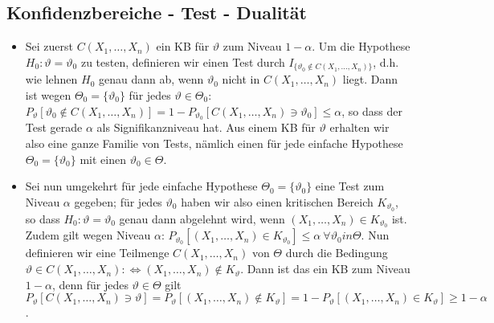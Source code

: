\subsection{Konfidenzbereiche - Test - Dualität}
\begin{itemize}
    \item Sei zuerst $C(X_1, \dots, X_n)$ ein KB für $\vartheta$ zum Niveau $1 - \alpha$. Um die Hypothese $H_0 : \vartheta = \vartheta_0$ zu testen, definieren wir einen Test durch $I_{\{\vartheta_0 \notin C(X_1, \dots, X_n)\} }$, d.h. wie lehnen $H_0$ genau dann ab, wenn $\vartheta_0$ nicht in $C(X_1, \dots, X_n)$ liegt. Dann ist wegen $\Theta_0 = \{\vartheta_0\}$ für jedes $\vartheta \in \Theta_0$:\\
    $P_\vartheta[\vartheta_0 \notin C(X_1, \dots, X_n)] = 1 - P_{\vartheta_0}[C(X_1, \dots, X_n) \ni \vartheta_0] \le \alpha$, so dass der Test gerade $\alpha$ als Signifikanzniveau hat. Aus einem KB für $\vartheta$ erhalten wir also eine ganze Familie von Tests, nämlich einen für jede einfache Hypothese $\Theta_0 = \{\vartheta_0\}$ mit einen $\vartheta_0 \in \Theta$.
\item Sei nun umgekehrt für jede einfache Hypothese $\Theta_0 = \{\vartheta_0\} $ eine Test zum Niveau $\alpha$ gegeben; für jedes $\vartheta_0$ haben wir also einen kritischen Bereich $K_{\vartheta_0}$, so dass $H_0: \vartheta = \vartheta_0$ genau dann abgelehnt wird, wenn $(X_1, \dots, X_n) \in K_{\vartheta_0}$ ist. Zudem gilt wegen Niveau $\alpha$: $P_{\vartheta_0}[(X_1, \dots, X_n) \in K_{\vartheta_0}] \le \alpha \ \forall \vartheta_0 in \Theta$. Nun definieren wir eine Teilmenge $C(X_1, \dots, X_n)$ von $\Theta$ durch die Bedingung\\
    $\vartheta \in C(X_1, \dots, X_n) :\iff (X_1, \dots, X_n) \notin K_\vartheta$. Dann ist das ein KB zum Niveau $1 - \alpha$, denn für jedes $\vartheta \in \Theta$ gilt\\
    $P_\vartheta[C(X_1, \dots, X_n) \ni \vartheta] = P_\vartheta[(X_1, \dots, X_n) \notin K_\vartheta] = 1 - P_\vartheta[(X_1, \dots, X_n) \in K_\vartheta] \ge 1 - \alpha$.
\end{itemize}
